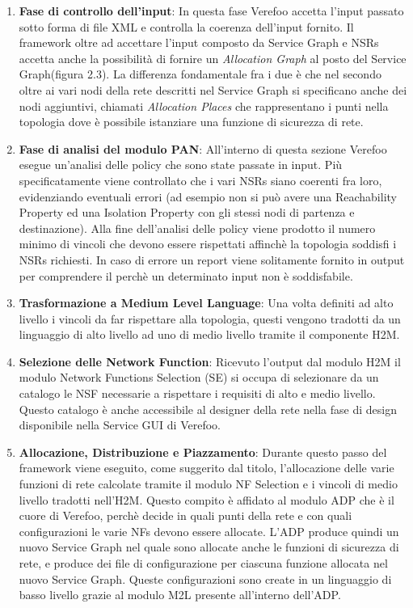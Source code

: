 \begin{enumerate}
    \item \textbf{Fase di controllo dell'input}: In questa fase Verefoo accetta l'input passato sotto forma di file XML e controlla la coerenza dell'input fornito. Il framework 
         oltre ad accettare l'input composto da Service Graph e NSRs accetta anche la possibilità di fornire un \textit{Allocation Graph} al posto del Service Graph(figura 2.3). La
         differenza fondamentale fra i due è che nel secondo oltre ai vari nodi della rete descritti nel Service Graph si specificano anche dei nodi aggiuntivi, chiamati \textit{Allocation Places}
         che rappresentano i punti nella topologia dove è possibile istanziare una funzione di sicurezza di rete.
    \item \textbf{Fase di analisi del modulo PAN}: All'interno di questa sezione Verefoo esegue un'analisi delle policy che sono state passate in input. Più specificatamente viene controllato che i vari NSRs siano coerenti fra
    loro, evidenziando eventuali errori (ad esempio non si può avere una Reachability Property ed una Isolation Property con gli stessi nodi di partenza e destinazione). Alla fine dell'analisi delle policy
    viene prodotto il numero minimo di vincoli che devono essere rispettati affinchè la topologia soddisfi i NSRs richiesti. In caso di errore un report viene solitamente fornito in output per comprendere 
    il perchè un determinato input non è soddisfabile.
    \item \textbf{Trasformazione a Medium Level Language}: Una volta definiti ad alto livello i vincoli da far rispettare alla topologia, questi vengono tradotti da un linguaggio di alto livello
    ad uno di medio livello tramite il componente H2M. 
    \item  \textbf{Selezione delle Network Function}: Ricevuto l'output dal modulo H2M il modulo Network Functions Selection (SE) si occupa di selezionare da un catalogo le NSF necessarie a rispettare i requisiti
    di alto e medio livello. Questo catalogo è anche accessibile al designer della rete nella fase di design disponibile nella Service GUI di Verefoo.
    \item \textbf{Allocazione, Distribuzione e Piazzamento}: Durante questo passo del framework viene eseguito, come suggerito dal titolo, l'allocazione delle varie funzioni di rete calcolate tramite
    il modulo NF Selection e i vincoli di medio livello tradotti nell'H2M. Questo compito è affidato al modulo ADP che è il cuore di Verefoo, perchè decide in quali punti della rete e con quali configurazioni
    le varie NFs devono essere allocate. L'ADP produce quindi un nuovo Service Graph nel quale sono allocate anche le funzioni di sicurezza di rete, e produce dei file di configurazione per ciascuna funzione allocata
    nel nuovo Service Graph. Queste configurazioni sono create in un linguaggio di basso livello grazie al modulo M2L presente all'interno dell'ADP.
\end{enumerate}


